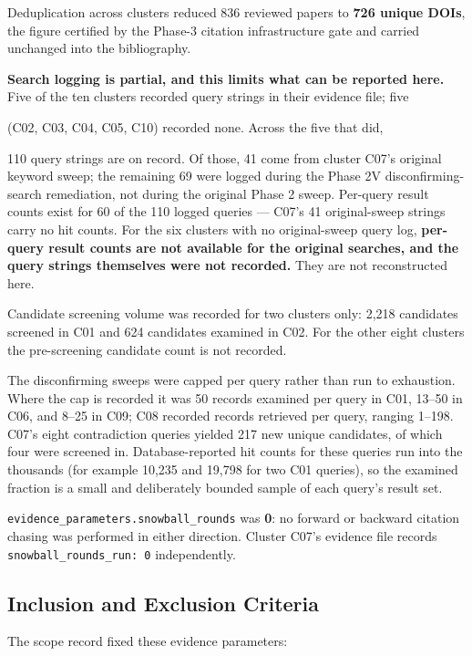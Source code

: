 \documentclass[11pt]{article}
\begin{document}
Deduplication across clusters reduced 836 reviewed papers to \textbf{726 unique DOIs}, the figure certified by the Phase-3 citation infrastructure gate and carried unchanged into the bibliography.

\textbf{Search logging is partial, and this limits what can be reported here.} Five of the ten clusters recorded query strings in their evidence file; five

(C02, C03, C04, C05, C10) recorded none. Across the five that did,

110 query strings are on record. Of those, 41 come from cluster C07's original keyword sweep; the remaining 69 were logged during the Phase 2V disconfirming-search remediation, not during the original Phase 2 sweep. Per-query result counts exist for 60 of the 110 logged queries --- C07's 41 original-sweep strings carry no hit counts. For the six clusters with no original-sweep query log, \textbf{per-query result counts are not available for the original searches, and the query strings themselves were not recorded.} They are not reconstructed here.

Candidate screening volume was recorded for two clusters only: 2,218 candidates screened in C01 and 624 candidates examined in C02. For the other eight clusters the pre-screening candidate count is not recorded.

The disconfirming sweeps were capped per query rather than run to exhaustion. Where the cap is recorded it was 50 records examined per query in C01, 13--50 in C06, and 8--25 in C09; C08 recorded records retrieved per query, ranging 1--198. C07's eight contradiction queries yielded 217 new unique candidates, of which four were screened in. Database-reported hit counts for these queries run into the thousands (for example 10,235 and 19,798 for two C01 queries), so the examined fraction is a small and deliberately bounded sample of each query's result set.

\texttt{evidence\_parameters.snowball\_rounds} was \textbf{0}: no forward or backward citation chasing was performed in either direction. Cluster C07's evidence file records \texttt{snowball\_rounds\_run: 0} independently.

\subsection{Inclusion and Exclusion Criteria}
\label{sec-methods-inclusion}

The scope record fixed these evidence parameters:
\end{document}
